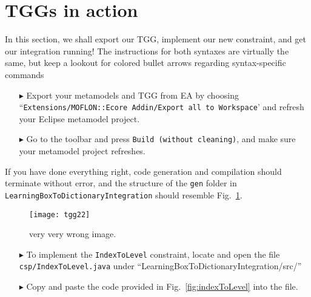 \newpage
\section{TGGs in action}
\genHeader
\label{sect:TGGs_in_Action}
In this section, we shall export our TGG, implement our new constraint, and get our integration running! The instructions for both syntaxes are virtually the
same, but keep a lookout for colored bullet arrows regarding syntax-specific commands

\vspace{0.5cm}

\begin{itemize}
\item[\color{RedOrange}$\blacktriangleright$] Export your metamodels and TGG from EA by choosing ``\texttt{Extensions/\-MOFLON::\-Ecore Addin\-/Export all to
Workspace}' and refresh your Eclipse metamodel project.

\vspace{0.5cm}

\item[\color{CornflowerBlue}$\blacktriangleright$] Go to the toolbar and press \texttt{Build (without cleaning)}, and make sure your metamodel project
refreshes.
\end{itemize}

\vspace{0.5cm}

If you have done everything right, code generation and compilation should terminate without error, and the structure of the \texttt{gen} folder in
\texttt{LearningBox\-To\-Dictionary\-Integration} should resemble Fig.~\ref{fig:gen_folder}.

\begin{figure}[htbp]
\begin{center}
  \texttt{[image: tgg22]}
  \caption{\update very very wrong image.}
  \label{fig:gen_folder}
\end{center}
\end{figure}

\begin{itemize}

\vspace{0.5cm}
  
\item[$\blacktriangleright$] To implement the \texttt{IndexToLevel} constraint, locate and open the file \texttt{csp/IndexToLevel.java} under
  ``LearningBoxToDictionaryIntegration/src/'' 

\vspace{0.5cm}
  
\item[$\blacktriangleright$] Copy and paste the code provided in Fig.~\ref{fig:indexToLevel} into the file.

\end{itemize}

